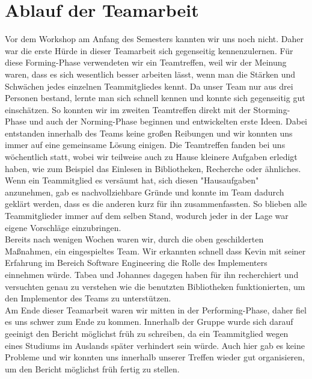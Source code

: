 \documentclass[12pt]{article}
\begin{document}
\section{Ablauf der Teamarbeit}
Vor dem Workshop am Anfang des Semesters kannten wir uns noch nicht. Daher war die erste Hürde in dieser Teamarbeit sich gegenseitig kennenzulernen. Für diese Forming-Phase verwendeten wir ein Teamtreffen, weil wir der Meinung waren, dass es sich wesentlich besser arbeiten lässt, wenn man die Stärken und Schwächen jedes einzelnen Teammitgliedes kennt. Da unser Team nur aus drei Personen bestand, lernte man sich schnell kennen und konnte sich gegenseitig gut einschätzen. So konnten wir im zweiten Teamtreffen direkt mit der Storming-Phase und auch der Norming-Phase beginnen und entwickelten erste Ideen. Dabei entstanden innerhalb des Teams keine großen Reibungen und wir konnten uns immer auf eine gemeinsame Lösung einigen. Die Teamtreffen fanden bei uns wöchentlich statt, wobei wir teilweise auch zu Hause kleinere Aufgaben erledigt haben, wie zum Beispiel das Einlesen in Bibliotheken, Recherche oder ähnliches. Wenn ein Teammitglied es versäumt hat, sich diesen "Hausaufgaben" anzunehmen, gab es nachvollziehbare Gründe und konnte im Team dadurch geklärt werden, dass es die anderen kurz für ihn zusammenfassten. So blieben alle Teammitglieder immer auf dem selben Stand, wodurch jeder in der Lage war eigene Vorschläge einzubringen. \\ Bereits nach wenigen Wochen waren wir, durch die oben geschilderten Maßnahmen, ein eingespieltes Team. Wir erkannten schnell dass Kevin mit seiner Erfahrung im Bereich Software Engineering die Rolle des Implementers einnehmen würde. Tabea und Johannes dagegen haben für ihn recherchiert und versuchten genau zu verstehen wie die benutzten Bibliotheken funktionierten, um den Implementor des Teams zu unterstützen. \\
Am Ende dieser Teamarbeit waren wir mitten in der Performing-Phase, daher fiel es uns schwer zum Ende zu kommen. Innerhalb der Gruppe wurde sich darauf geeinigt den Bericht möglichst früh zu schreiben, da ein Teammitglied wegen eines Studiums im Auslands später verhindert sein würde. Auch hier gab es keine Probleme und wir konnten uns innerhalb unserer Treffen wieder gut organisieren, um den Bericht möglichst früh fertig zu stellen.
\clearpage
\end{document}
